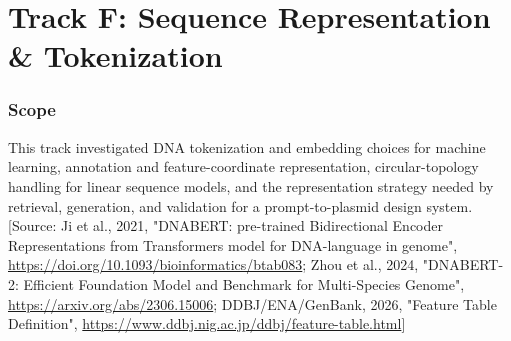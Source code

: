 \documentclass[11pt]{report}
\begin{document}
\chapter{Track F: Sequence Representation \& Tokenization}

\subsection{Scope}
This track investigated DNA tokenization and embedding choices for machine learning, annotation and feature-coordinate representation, circular-topology handling for linear sequence models, and the representation strategy needed by retrieval, generation, and validation for a prompt-to-plasmid design system. [Source: Ji et al., 2021, "DNABERT: pre-trained Bidirectional Encoder Representations from Transformers model for DNA-language in genome", \url{https://doi.org/10.1093/bioinformatics/btab083}; Zhou et al., 2024, "DNABERT-2: Efficient Foundation Model and Benchmark for Multi-Species Genome", \url{https://arxiv.org/abs/2306.15006}; DDBJ/ENA/GenBank, 2026, "Feature Table Definition", \url{https://www.ddbj.nig.ac.jp/ddbj/feature-table.html}]\par
\end{document}
